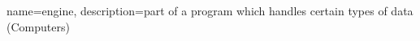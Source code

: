 
{
	name=engine, 
	description={part of a program which handles certain types of data (Computers)}
}
